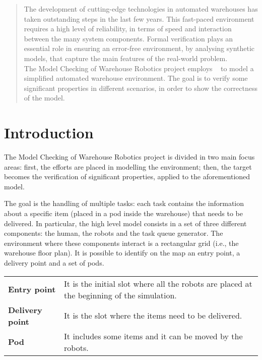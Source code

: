 \begin{abstract}
The development of cutting-edge technologies in automated warehouses has taken outstanding steps in the last few years. 
This fast-paced environment requires a high level of reliability, in terms of speed and interaction between the many system components.
Formal verification plays an essential role in ensuring an error-free environment, by analysing synthetic models, that capture the main features of the real-world problem.\\
The Model Checking of Warehouse Robotics project employs \UPPAAL\ \cite{uppaal} to model a simplified automated warehouse environment. The goal is to verify some significant properties in different scenarios, in order to show the correctness of the model.
\end{abstract}

\section{Introduction}
The Model Checking of Warehouse Robotics project is divided in two main focus areas: first, the efforts are placed in modelling the environment; then, the target becomes the verification of significant properties, applied to the aforementioned model.

The goal is the handling of multiple tasks: each task contains the information about a specific item (placed in a pod inside the warehouse) that needs to be delivered. 
In particular, the high level model consists in a set of three different components: the human, the robots and the task queue generator.
The environment where these components interact is a rectangular grid (i.e., the warehouse floor plan). It is possible to identify on the map an entry point, a delivery point and a set of pods.

\begin{tabularx}{\textwidth}{lX}
\textbf{Entry point} & It is the initial slot where all the robots are placed at the beginning of the simulation.\vspace{0,2cm}\\
\textbf{Delivery point} & It is the slot where the items need to be delivered.\vspace{0,2cm}\\
\textbf{Pod} & It includes some items and it can be moved by the robots.\vspace{0,2cm}\\
\end{tabularx}

